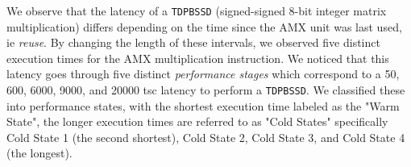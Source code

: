         
         




We observe that the latency of a \texttt{TDPBSSD} (signed-signed 8-bit integer matrix multiplication) differs depending on the time since the AMX unit was last used, ie \textit{ reuse}. 
By changing the length of these intervals, we observed five distinct execution times for the AMX multiplication instruction.  We noticed that this latency goes through five distinct \textit{performance stages} which correspond to a 50, 600, 6000, 9000, and 20000 tsc latency to perform a \texttt{TDPBSSD}. We classified these into performance states, with the shortest execution time labeled as the "Warm State", the longer execution times are referred to as "Cold States" specifically Cold State 1 (the second shortest), Cold State 2, Cold State 3, and Cold State 4 (the longest).  

